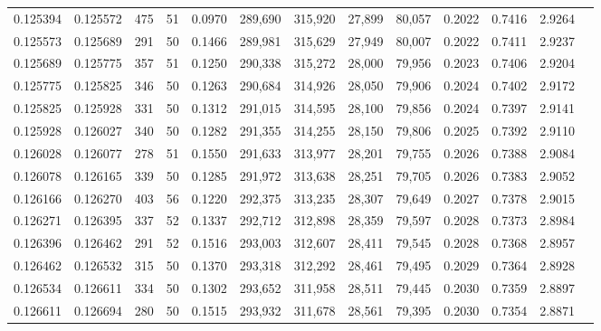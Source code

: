 \begin{tabular}{rrrrrrrrrrrrr}
0.125394 & 0.125572 &   475 &  51 &                                     0.0970 & 289,690 & 315,920 &  27,899 &  80,057 & 0.2022 & 0.7416 & 2.9264 \\
0.125573 & 0.125689 &   291 &  50 &                                     0.1466 & 289,981 & 315,629 &  27,949 &  80,007 & 0.2022 & 0.7411 & 2.9237 \\
0.125689 & 0.125775 &   357 &  51 &                                     0.1250 & 290,338 & 315,272 &  28,000 &  79,956 & 0.2023 & 0.7406 & 2.9204 \\
0.125775 & 0.125825 &   346 &  50 &                                     0.1263 & 290,684 & 314,926 &  28,050 &  79,906 & 0.2024 & 0.7402 & 2.9172 \\
0.125825 & 0.125928 &   331 &  50 &                                     0.1312 & 291,015 & 314,595 &  28,100 &  79,856 & 0.2024 & 0.7397 & 2.9141 \\
0.125928 & 0.126027 &   340 &  50 &                                     0.1282 & 291,355 & 314,255 &  28,150 &  79,806 & 0.2025 & 0.7392 & 2.9110 \\
0.126028 & 0.126077 &   278 &  51 &                                     0.1550 & 291,633 & 313,977 &  28,201 &  79,755 & 0.2026 & 0.7388 & 2.9084 \\
0.126078 & 0.126165 &   339 &  50 &                                     0.1285 & 291,972 & 313,638 &  28,251 &  79,705 & 0.2026 & 0.7383 & 2.9052 \\
0.126166 & 0.126270 &   403 &  56 &                                     0.1220 & 292,375 & 313,235 &  28,307 &  79,649 & 0.2027 & 0.7378 & 2.9015 \\
0.126271 & 0.126395 &   337 &  52 &                                     0.1337 & 292,712 & 312,898 &  28,359 &  79,597 & 0.2028 & 0.7373 & 2.8984 \\
0.126396 & 0.126462 &   291 &  52 &                                     0.1516 & 293,003 & 312,607 &  28,411 &  79,545 & 0.2028 & 0.7368 & 2.8957 \\
0.126462 & 0.126532 &   315 &  50 &                                     0.1370 & 293,318 & 312,292 &  28,461 &  79,495 & 0.2029 & 0.7364 & 2.8928 \\
0.126534 & 0.126611 &   334 &  50 &                                     0.1302 & 293,652 & 311,958 &  28,511 &  79,445 & 0.2030 & 0.7359 & 2.8897 \\
0.126611 & 0.126694 &   280 &  50 &                                     0.1515 & 293,932 & 311,678 &  28,561 &  79,395 & 0.2030 & 0.7354 & 2.8871 \\

\end{tabular}
